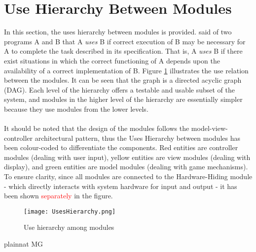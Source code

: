 \documentclass[12pt, titlepage]{article}
\begin{document}
\section{Use Hierarchy Between Modules} \label{SecUse}

In this section, the uses hierarchy between modules is
provided. \citet{Parnas1978} said of two programs A and B that A {\em uses} B if
correct execution of B may be necessary for A to complete the task described in
its specification. That is, A {\em uses} B if there exist situations in which
the correct functioning of A depends upon the availability of a correct
implementation of B.  Figure \ref{FigUH} illustrates the use relation between
the modules. It can be seen that the graph is a directed acyclic graph
(DAG). Each level of the hierarchy offers a testable and usable subset of the
system, and modules in the higher level of the hierarchy are essentially simpler
because they use modules from the lower levels.\\\\
\noindent It should be noted that the design of the modules follows the model-view-controller
architectural pattern, thus the Uses Hierarchy between modules has been colour-coded to differentiate
the components. Red entities are controller modules (dealing with user input), yellow entities are view 
modules (dealing with display), and green entities are model modules (dealing with game mechanisms).
To ensure clarity, since all modules are connected to the Hardware-Hiding module - which directly interacts
with system hardware for input and output - it has been shown \textcolor{red}{separately} in the figure. \\
\begin{figure}[H]
\centering
\texttt{[image: UsesHierarchy.png]}
\caption{Use hierarchy among modules}
\label{FigUH}
\end{figure}

\newpage
 {plainnat}
 {MG}
\end{document}
